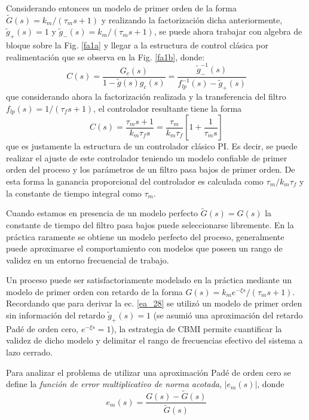 Considerando entonces un modelo de primer orden de la forma $\tilde{G}(s)=k_{m}/(\tau_{m} s+1)$ y realizando
la factorizaci{\'o}n dicha anteriormente, $\tilde{g}_{+}(s)=1$ y $\tilde{g}_{-}(s)=k_{m}/(\tau_{m} s+1)$, se
puede ahora trabajar con algebra de bloque sobre la Fig. \ref{fa1a} y llegar a la estructura de control
cl{\'a}sica por realimentaci{\'o}n que se observa en la Fig. \ref{fa1b}, donde:
\begin{equation}
    C(s)=\frac{G_{c}(s)}{1-\tilde{g}(s)g_{c}(s)}=\frac{\tilde{g}^{-1}_{-}(s)}{f^{-1}_{lp}(s)-\tilde{g}_{+}(s)}
\end{equation}
que considerando ahora la factorizaci{\'o}n realizada y la transferencia del filtro $f_{lp}(s)=1/(\tau_{f}
s+1)$, el controlador resultante tiene la forma
\begin{equation}\label{ea_28}
    C(s)=\frac{\tau_{m} s +1}{k_{m}\tau_{f} s}=\frac{\tau_{m}}{k_{m}\tau_{f}}\left[1+\frac{1}{\tau_{m} s}\right]
\end{equation}
que es justamente la estructura de un controlador cl{\'a}sico PI. Es decir, se puede realizar el ajuste de este
controlador teniendo un modelo confiable de primer orden del proceso y los par{\'a}metros de un filtro pasa
bajos de primer orden. De esta forma la ganancia proporcional del controlador es calculada como
$\tau_{m}/k_{m}\tau_{f}$ y la constante de tiempo integral como $\tau_{m}$.

Cuando estamos en presencia de un modelo perfecto $\tilde{G}(s)=G(s)$ la constante de tiempo del filtro pasa
bajos puede seleccionarse libremente. En la pr{\'a}ctica raramente se obtiene un modelo perfecto del proceso,
generalmente puede aproximarse el comportamiento con modelos que poseen un rango de validez en un entorno
frecuencial de trabajo.

Un proceso puede ser satisfactoriamente modelado en la pr{\'a}ctica mediante un modelo de primer orden con
retardo de la forma $G(s)=k_{m}e^{-\xi s}/(\tau_{m} s+1)$. Recordando que para derivar la ec. \ref{ea_28} se
utiliz{\'o} un modelo de primer orden sin informaci{\'o}n del retardo $\tilde{g}_{+}(s)=1$ (se asumi{\'o} una
aproximaci{\'o}n del retardo Pad{\'e} de orden cero, $e^{-\xi s}=1$), la estrategia de CBMI permite cuantificar la
validez de dicho modelo y delimitar el rango de frecuencias efectivo del sistema a lazo cerrado.

Para analizar el problema de utilizar una aproximaci{\'o}n Pad{\'e} de orden cero se define la \textit{funci{\'o}n de
error multiplicativo de norma acotada}, $|e_{m}(s)|$, donde
\begin{equation}
    e_{m}(s)=\frac{G(s)-\tilde{G}(s)}{\tilde{G}(s)}
\end{equation}

